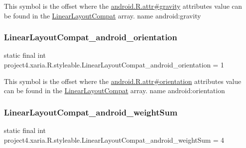 This symbol is the offset where the \hyperlink{}{android.\+R.\+attr\#gravity} attribute\textquotesingle{}s value can be found in the \hyperlink{classproject4_1_1xaria_1_1R_1_1styleable_a7f929bdf7d740d51fa83ce463e56c432}{Linear\+Layout\+Compat} array.  name android\+:gravity \mbox{\label{classproject4_1_1xaria_1_1R_1_1styleable_a2cd81e7b3c982ef6daea0093965c9ea9}} 
\subsubsection{\texorpdfstring{Linear\+Layout\+Compat\+\_\+android\+\_\+orientation}{LinearLayoutCompat\_android\_orientation}}
{\footnotesize\ttfamily static final int project4.\+xaria.\+R.\+styleable.\+Linear\+Layout\+Compat\+\_\+android\+\_\+orientation = 1\hspace{0.3cm}{\ttfamily [static]}}

This symbol is the offset where the \hyperlink{}{android.\+R.\+attr\#orientation} attribute\textquotesingle{}s value can be found in the \hyperlink{classproject4_1_1xaria_1_1R_1_1styleable_a7f929bdf7d740d51fa83ce463e56c432}{Linear\+Layout\+Compat} array.  name android\+:orientation \mbox{\label{classproject4_1_1xaria_1_1R_1_1styleable_a3787a7bcd5b812a12873e33ec20a496c}} 
\subsubsection{\texorpdfstring{Linear\+Layout\+Compat\+\_\+android\+\_\+weight\+Sum}{LinearLayoutCompat\_android\_weightSum}}
{\footnotesize\ttfamily static final int project4.\+xaria.\+R.\+styleable.\+Linear\+Layout\+Compat\+\_\+android\+\_\+weight\+Sum = 4\hspace{0.3cm}{\ttfamily [static]}}

